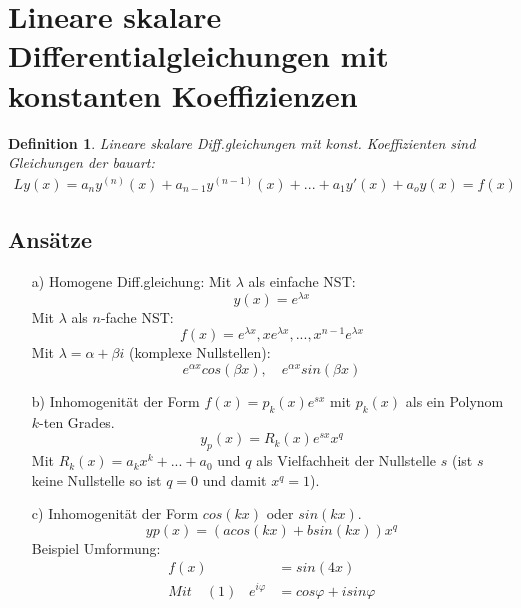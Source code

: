 \documentclass[12pt,a4paper]{report}%
\newtheorem{definition}[satz]{Definition}
\numberwithin{equation}{section}
\numberwithin{equation}{subsection}
\begin{document}
\section{Lineare skalare Differentialgleichungen mit konstanten Koeffizienzen}
  \begin{definition}
    Lineare skalare Diff.gleichungen mit konst. Koeffizienten sind Gleichungen der bauart:
    \begin{align*}
      Ly(x) = a_n y^{(n)}(x)+a_{n-1}y^{(n-1)}(x)+...+a_1y'(x) + a_o y(x) = f(x)
    \end{align*}
  \end{definition}
  \subsection{Ansätze}
  \begin{itemize}
    \item[a)] Homogene Diff.gleichung:
    Mit $\lambda$ als einfache NST:
    \begin{equation}
      y(x) = e^{\displaystyle\lambda x} \label{eq:dgl_Ansatz_a}
    \end{equation}
    Mit $\lambda$ als $n$-fache NST:
    \begin{equation}
      f(x) = e^{\displaystyle\lambda x}, xe^{\displaystyle\lambda x}, ..., x^{n-1}e^{\displaystyle\lambda x} 
    \end{equation}
    Mit $\lambda = \alpha + \beta i$ (komplexe Nullstellen):
    \begin{equation}
      e^{\alpha x}cos(\beta x),\quad e^{\alpha x} sin(\beta x)
    \end{equation}
    \item[b)] Inhomogenität der Form $f(x) = p_k(x) e^{sx}$ mit $p_k(x)$ als ein Polynom $k$-ten Grades.
    \begin{equation}
      y_p(x) = R_k(x)e^{sx}x^q
    \end{equation}
    Mit $R_k(x) = a_kx^k+...+a_0$ und $q$ als Vielfachheit der Nullstelle $s$ (ist $s$ keine Nullstelle so ist $q = 0$ und damit $x^q = 1$).
    \item[c)] Inhomogenität der Form $cos(kx)$ oder $sin(kx)$.
    \begin{equation}
      yp(x) = (a cos(kx) + b sin(kx)) x^q
    \end{equation}
    Beispiel Umformung:
    \begin{align}
      f(x) &= sin(4x)\nonumber\\
      Mit \quad
      (1)\;\;\; e^{i\varphi} &= cos \varphi + i sin\varphi\nonumber \\

\end{align}
\end{itemize}
\end{document}
